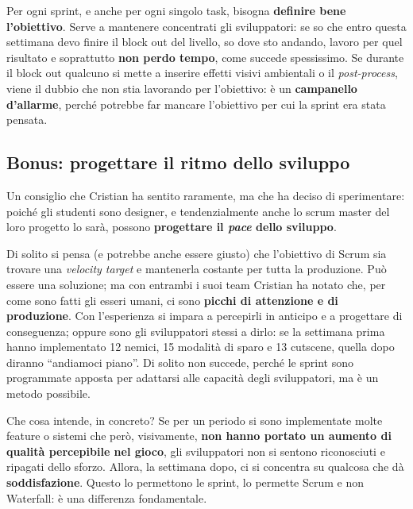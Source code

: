Per ogni sprint, e anche per ogni singolo task, bisogna \textbf{definire bene
l'obiettivo}. Serve a mantenere concentrati gli sviluppatori: se so che entro
questa settimana devo finire il block out del livello, so dove sto andando,
lavoro per quel risultato e soprattutto \textbf{non perdo tempo}, come succede
spessissimo. Se durante il block out qualcuno si mette a inserire effetti
visivi ambientali o il \emph{post-process}, viene il dubbio che non stia
lavorando per l'obiettivo: è un \textbf{campanello d'allarme}, perché potrebbe
far mancare l'obiettivo per cui la sprint era stata pensata.

\subsection{Bonus: progettare il ritmo dello sviluppo}

Un consiglio che Cristian ha sentito raramente, ma che ha deciso di
sperimentare: poiché gli studenti sono designer, e tendenzialmente anche lo
scrum master del loro progetto lo sarà, possono \textbf{progettare il
\emph{pace} dello sviluppo}.

Di solito si pensa (e potrebbe anche essere giusto) che l'obiettivo di Scrum
sia trovare una \emph{velocity target} e mantenerla costante per tutta la
produzione. Può essere una soluzione; ma con entrambi i suoi team Cristian ha
notato che, per come sono fatti gli esseri umani, ci sono \textbf{picchi di
attenzione e di produzione}. Con l'esperienza si impara a percepirli in
anticipo e a progettare di conseguenza; oppure sono gli sviluppatori stessi a
dirlo: se la settimana prima hanno implementato 12 nemici, 15 modalità di sparo
e 13 cutscene, quella dopo diranno ``andiamoci piano''. Di solito non succede,
perché le sprint sono programmate apposta per adattarsi alle capacità degli
sviluppatori, ma è un metodo possibile.

Che cosa intende, in concreto? Se per un periodo si sono implementate molte
feature o sistemi che però, visivamente, \textbf{non hanno portato un aumento
di qualità percepibile nel gioco}, gli sviluppatori non si sentono
riconosciuti e ripagati dello sforzo. Allora, la settimana dopo, ci si
concentra su qualcosa che dà \textbf{soddisfazione}. Questo lo permettono le
sprint, lo permette Scrum e non Waterfall: è una differenza fondamentale.

